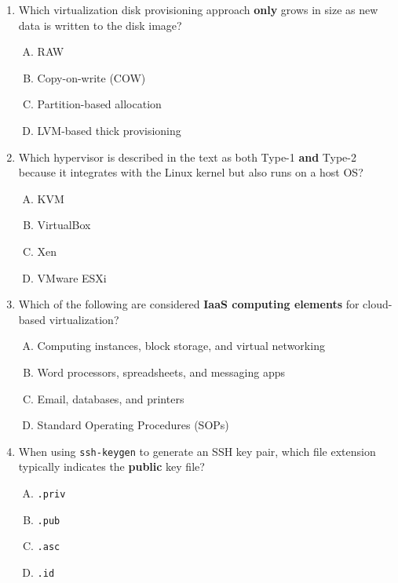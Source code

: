 \documentclass[a4paper]{report}
\begin{document}
\begin{enumerate}[1.]
    \item Which virtualization disk provisioning approach \textbf{only} grows in size as new data is written to the disk image?  
    \begin{enumerate}[A)]
        \item RAW  
        \item Copy-on-write (COW)  
        \item Partition-based allocation  
        \item LVM-based thick provisioning  
    \end{enumerate}

    \item Which hypervisor is described in the text as both Type-1 \textbf{and} Type-2 because it integrates with the Linux kernel but also runs on a host OS?  
    \begin{enumerate}[A)]
        \item KVM  
        \item VirtualBox  
        \item Xen  
        \item VMware ESXi  
    \end{enumerate}

    \item Which of the following are considered \textbf{IaaS computing elements} for cloud-based virtualization?  
    \begin{enumerate}[A)]
        \item Computing instances, block storage, and virtual networking  
        \item Word processors, spreadsheets, and messaging apps  
        \item Email, databases, and printers  
        \item Standard Operating Procedures (SOPs)  
    \end{enumerate}

    \item When using \texttt{ssh-keygen} to generate an SSH key pair, which file extension typically indicates the \textbf{public} key file?  
    \begin{enumerate}[A)]
        \item \texttt{.priv}  
        \item \texttt{.pub}  
        \item \texttt{.asc}  
        \item \texttt{.id}  
    \end{enumerate}


\end{enumerate}
\end{document}
